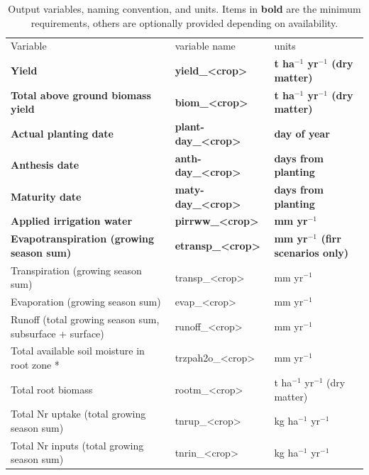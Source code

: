 \documentclass[gmd, manuscript]{copernicus} %
\begin{document}
\begin{table}[]
\caption{Output variables, naming convention, and units. Items in \textbf{bold} are the minimum requirements, others are optionally provided depending on availability.}
\begin{tabular}{lll}
        \tophline \vspace{1mm}
Variable                                & variable name             & units \\
\middlehline \vspace{1mm}
\textbf{Yield}                                   & \textbf{yield\_<crop>}     & \textbf{t ha$^{-1}$ yr$^{-1}$ (dry matter)}\\
\textbf{Total above ground biomass yield}        & \textbf{biom\_<crop>}      & \textbf{t ha$^{-1}$ yr$^{-1}$ (dry matter)}\\
\textbf{Actual planting date}                    & \textbf{plant-day\_<crop>} & \textbf{day of year}\\
\textbf{Anthesis date}                           & \textbf{anth-day\_<crop>}  & \textbf{days from planting} \\
\textbf{Maturity date}                           & \textbf{maty-day\_<crop>}  & \textbf{days from planting}\\
\textbf{Applied irrigation water}                & \textbf{pirrww\_<crop>}    & \textbf{mm yr$^{-1}$} \\
\textbf{Evapotranspiration (growing season sum)} & \textbf{etransp\_<crop>}   & \textbf{mm yr$^{-1}$ (firr scenarios only)}\\ \middlehline
Transpiration (growing season sum)                       & transp\_<crop>    & mm yr$^{-1}$ \\
Evaporation (growing season sum)                         & evap\_<crop>      & mm yr$^{-1}$ \\
Runoff (total growing season sum, subsurface + surface)  & runoff\_<crop>    & mm yr$^{-1}$                    \\
Total available soil moisture in root zone *             & trzpah2o\_<crop>  & mm yr$^{-1}$                    \\
Total root biomass                                       & rootm\_<crop>     & t ha$^{-1}$ yr$^{-1}$ (dry matter)  \\
Total Nr uptake (total growing season sum)               & tnrup\_<crop>     & kg ha$^{-1}$ yr$^{-1}$              \\
Total Nr inputs (total growing season sum)               & tnrin\_<crop>     & kg ha$^{-1}$ yr$^{-1}$              \\

\end{tabular}
\end{table}
\end{document}
